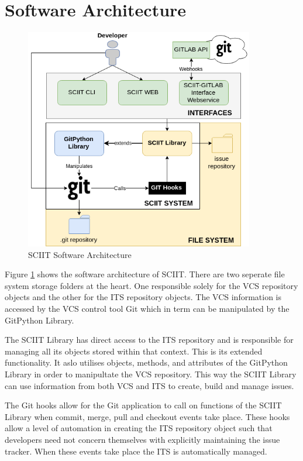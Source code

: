 \documentclass{mproj}
\begin{document}
\section{Software Architecture}

\begin{figure}[h!]
\caption{SCIIT Software Architecture}
\label{fig:sciit-software-arch}
\centering
\includegraphics[width=10cm]{sciit-software-arch}
\end{figure}


Figure \ref{fig:sciit-software-arch} shows the software architecture of SCIIT. There are two seperate file system storage folders at the heart. One responsible solely for the VCS repository objects and the other for the ITS repository objects. The VCS information is accessed by the VCS control tool Git which in term can be manipulated by the GitPython Library. 

The SCIIT Library has direct access to the ITS repository and is responsible for managing all its objects stored within that context. This is its extended functionality. It aslo utilises objects, methods, and attributes of the GitPython Library in order to manipultate the VCS repository. This way the SCIIT Library can use information from both VCS and ITS to create, build and manage issues.

The Git hooks allow for the Git application to call on functions of the SCIIT Library when commit, merge, pull and checkout events take place. These hooks allow a level of automation in creating the ITS repository object such that developers need not concern themselves with explicitly maintaining the issue tracker. When these events take place the ITS is automatically managed.
\end{document}
